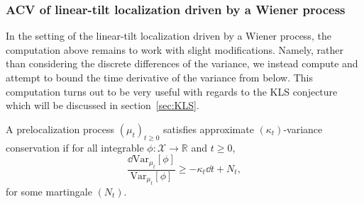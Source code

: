 \subsubsection{ACV of linear-tilt localization driven by a Wiener process}

In the setting of the linear-tilt localization driven by a Wiener process, the computation above remains 
to work with slight modifications. Namely, rather than considering the discrete differences of the 
variance, we instead compute and attempt to bound the time derivative of the variance from below. 
This computation turns out to be very useful with regards to the KLS conjecture which will be discussed 
in section~\ref{sec:KLS}.

\begin{definition}
  A prelocalization process \((\mu_t)_{t \ge 0}\) satisfies approximate \((\kappa_t)\)-variance conservation if 
  for all integrable \(\phi : \mathcal{X} \to \mathbb{R}\) and \(t \ge 0\), 
  \[\frac{\dd \text{Var}_{\mu_t}[\phi]}{\text{Var}_{\mu_t}[\phi]} \ge -\kappa_t \dd t + N_t,\]
  for some martingale \((N_t)\).
\end{definition}



